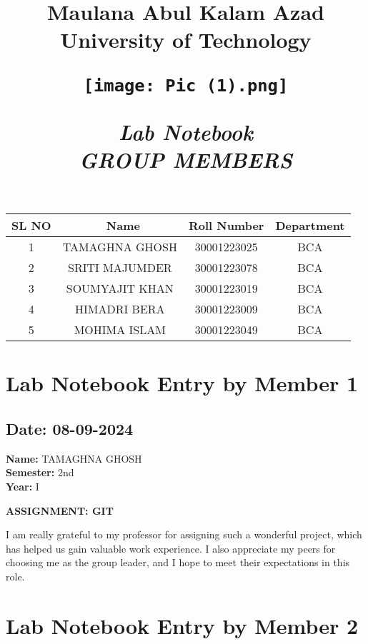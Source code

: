\documentclass[12pt]{article}
\title{
    \vspace{0.2in}
    \Huge \textbf{Maulana Abul Kalam Azad University of Technology} \\
    \vspace{0.5in} %
    \begin{center}
        \texttt{[image: Pic (1).png]} %
    \end{center}
    \vspace{0.5in}
    \Huge\textbf{\textit{Lab Notebook}} \\
    \vspace{0.5in}
    \newpage
    \Large \textbf{\textit{GROUP MEMBERS}} \\
    \vspace{0.5in}
}
\date{}
\begin{document}
\maketitle

\begin{center}
    \begin{tabular}{|c| c | c | c |}
    \hline
    \textbf{SL NO}&\
    \textbf{Name} & \textbf{Roll Number} & \textbf{Department} \\
    \hline
     1 & TAMAGHNA GHOSH &30001223025 & BCA  \\
    \hline
     2& SRITI MAJUMDER & 30001223078 & BCA \\
    \hline
     3& SOUMYAJIT KHAN & 30001223019 & BCA   \\
    \hline
     4 & HIMADRI BERA & 30001223009 & BCA \\
    \hline
     5 & MOHIMA ISLAM & 30001223049  &  BCA \\
    \hline
    \end{tabular}
\end{center}

\newpage

\section{Lab Notebook Entry by Member 1}
\subsection*{Date: 08-09-2024}

\begin{flushright}
\textbf{Name:} TAMAGHNA GHOSH \\
\textbf{Semester:} 2nd \\
\textbf{Year:} I \\
\end{flushright}

\begin{center}
\Huge \textbf{ASSIGNMENT: GIT}
\end{center}

I am really grateful to my professor for assigning such a wonderful project, which has helped us gain valuable work experience. I also appreciate my peers for choosing me as the group leader, and I hope to meet their expectations in this role.

\newpage

\section{Lab Notebook Entry by Member 2}
\end{document}
